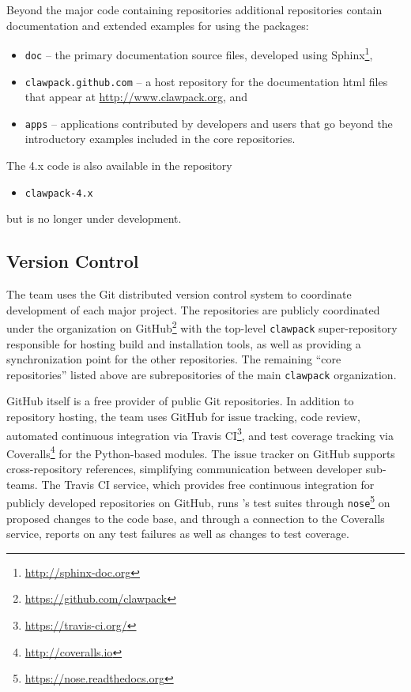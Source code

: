 Beyond the major code containing repositories additional repositories contain
documentation and extended examples for using the packages:
\begin{itemize}
    \item \texttt{doc} -- the primary documentation source files,
    developed using Sphinx\footnote{\url{http://sphinx-doc.org}},
    \item \texttt{clawpack.github.com} -- a host repository for the
    documentation html files
    that appear at \url{http://www.clawpack.org}, and
    \item \texttt{apps} -- applications contributed by developers and
    users that go beyond the introductory examples included in the core
    repositories.
\end{itemize}
The \clawpack 4.x code is also available in the repository
\begin{itemize}
    \item \texttt{clawpack-4.x}
\end{itemize}
but is no longer under development.


\subsection{Version Control}

The \clawpack team uses the Git distributed version control system
to coordinate development of each major project.  The repositories are
publicly coordinated under the \clawpack organization on
GitHub\footnote{\url{https://github.com/clawpack}} with the
top-level \texttt{clawpack} super-repository responsible for hosting
build and installation tools, as well as providing a synchronization
point for the other repositories.  The remaining ``core \clawpack repositories''
listed above are subrepositories of the main \texttt{clawpack} organization.

GitHub itself is a free provider of public Git repositories.  In addition to
repository hosting, the \clawpack team uses GitHub for issue tracking,
code review, automated continuous integration via Travis CI\footnote{\url{https://travis-ci.org/}},
and test coverage tracking via Coveralls\footnote{\url{http://coveralls.io}}
for the Python-based modules.  The issue tracker on
GitHub supports cross-repository references,
simplifying communication between \clawpack developer sub-teams.  The
Travis CI service, which provides free continuous integration for
publicly developed repositories on GitHub, runs \clawpack's test
suites through \texttt{nose}\footnote{\url{https://nose.readthedocs.org}}
on proposed changes
to the code base, and through a connection to the Coveralls service,
reports on any test failures as well as changes to test coverage.

